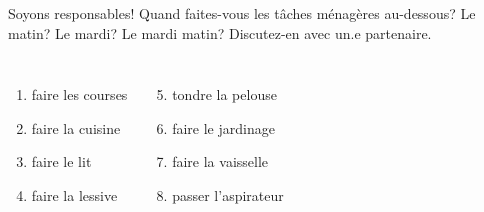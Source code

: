 \begin{frame}{Soyons responsables!}
  Quand faites-vous les tâches ménagères au-dessous?
  Le matin? Le mardi? Le mardi matin?
  Discutez-en avec un.e partenaire.
  \begin{columns}
      \begin{enumerate}
        \item faire les courses
        \item faire la cuisine
        \item faire le lit
        \item faire la lessive
      \end{enumerate}
      \begin{enumerate}
        \setcounter{enumi}{4}
        \item tondre la pelouse
        \item faire le jardinage
        \item faire la vaisselle
        \item passer l'aspirateur
      \end{enumerate}
  \end{columns}
\end{frame}